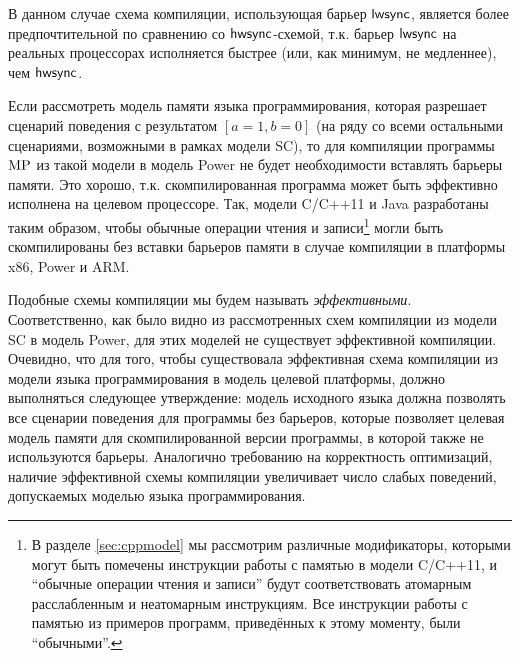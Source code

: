 В данном случае схема компиляции, использующая барьер $\mathsf{lwsync}$, является более предпочтительной по сравнению
со $\mathsf{hwsync}$-схемой, т.к. барьер $\mathsf{lwsync}$ на реальных процессорах исполняется быстрее
(или, как минимум, не медленнее), чем $\mathsf{hwsync}$.

Если рассмотреть модель памяти языка программирования, которая разрешает сценарий поведения 
с результатом $[a=1,b=0]$
(на ряду со всеми остальными сценариями, возможными в рамках модели SC), то для компиляции программы
${\rm MP}$ из такой модели в модель Power не будет необходимости вставлять барьеры памяти.
Это хорошо, т.к. скомпилированная программа может быть эффективно исполнена на целевом процессоре.
Так, модели C/C++11 \cite{Batty-al:POPL11} и Java \cite{Manson-al:POPL05} разработаны таким образом, чтобы
обычные операции чтения и записи\footnote{В разделе \ref{sec:cppmodel} мы рассмотрим различные модификаторы, которыми могут
быть помечены инструкции работы с памятью в модели C/C++11, и ``обычные операции чтения и записи'' будут соответствовать
атомарным расслабленным и неатомарным инструкциям.
Все инструкции работы с памятью из примеров программ, приведённых к этому моменту, были ``обычными''.}
могли быть скомпилированы без вставки барьеров памяти в случае компиляции в платформы x86, Power и ARM.

Подобные схемы компиляции мы будем называть \emph{эффективными}.
Соответственно, как было видно из рассмотренных схем компиляции из модели SC в модель Power,
для этих моделей не существует эффективной компиляции.
Очевидно, что для того, чтобы существовала эффективная схема компиляции из модели языка программирования в модель
целевой платформы, должно выполняться следующее утверждение:
модель исходного языка должна позволять все сценарии поведения для программы без барьеров,
которые позволяет целевая модель памяти для скомпилированной версии программы, в которой также не используются барьеры.
Аналогично требованию на корректность оптимизаций, наличие эффективной схемы компиляции
увеличивает число слабых поведений, допускаемых моделью языка программирования.



